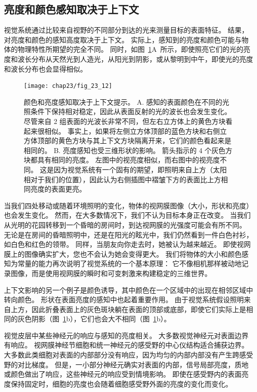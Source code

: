 \subsection{亮度和颜色感知取决于上下文}

视觉系统通过比较来自视野的不同部分到达的光来测量目标的表面特征。
结果，对亮度和颜色的感知高度取决于上下文。
实际上，感知到的亮度和颜色可能与物体的物理特性所期望的完全不同。
同时，如图~\ref{fig:23_12}A~所示，即使照亮它们的光的亮度和波长分布从天然光到人造光，从阳光到阴影，或从黎明到中午，即使光的亮度和波长分布也会显得相似。


\begin{figure}[htbp]
	\centering
	\texttt{[image: chap23/fig\_23\_12]}
	\caption{颜色和亮度感知取决于上下文提示。
		A. 感知的表面颜色在不同的光照条件下保持相对稳定，因此从表面反射的光的波长也会发生变化。
		尽管来自 2 组表面的光波长非常不同，但左右立方体上的黄色方块看起来很相似。
		事实上，如果将左侧立方体顶部的蓝色方块和右侧立方体顶部的黄色方块与其上下文方块隔离开来，它们的颜色看起来是相同的。
		B. 亮度感知也受三维形状的影响。
		箭头指示的 4 个灰色方块都具有相同的亮度。
		左图中的视亮度相似，而右图中的视亮度不同。
		这是因为视觉系统有一个固有的期望，即照明来自上方（太阳相对于我们的位置），因此认为右侧插图中褶皱下方的表面比上方相同亮度的表面更亮\cite{adelson1993perceptual}。}
	\label{fig:23_12}
\end{figure}


当我们四处移动或随着环境照明的变化，物体的视网膜图像（大小，形状和亮度）也会发生变化。
然而，在大多数情况下，我们不认为目标本身正在改变。
当我们从光明的花园转移到一个昏暗的房间时，到达视网膜的光强度可能会有所不同。
无论是在房间的昏暗照明中，还是在阳光的眩光中，我们仍然看到一件白色衬衫，如白色和红色的领带。
同样，当朋友向你走去时，她被认为越来越近。
即使视网膜上的图像确实扩大，您也不会认为她会变得更大。
我们将物体的大小和颜色感知为常量的能力再次说明了视觉系统的一个基本原理：
它不像相机那样被动地记录图像，而是使用视网膜的瞬时和可变刺激来构建稳定的三维世界。


上下文影响的另一个例子是颜色诱导，其中颜色在一个区域中的出现在相邻区域中转向颜色。
形状在表面亮度的感知中也起着重要作用。
由于视觉系统假设照明来自上方，因此折叠表面上的灰色斑块躺在表面的顶部或底部，即使它们实际上是相同的灰色阴影（图~\ref{fig:23_12}b），它们也会大不相同（图~\ref{fig:23_12}b）。


视觉皮层中某些神经元的响应与感知的亮度相关。
大多数视觉神经元对表面边界有响应。
视网膜神经节细胞和统一神经元的感受野的中心仪结构适合捕获边界。
大多数此类细胞对表面的内部部分没有响应，因为均匀的内部内部没有产生跨感受野的对比梯度。
但是，一小部分神经元确实对表面的内部，信号局部亮度，质地或颜色做出了响应，这些神经元的响应受到情境影响。
即使在感受野内的表面亮度保持固定时，细胞的亮度也会随着细胞感受野外面的亮度的变化而变化。


